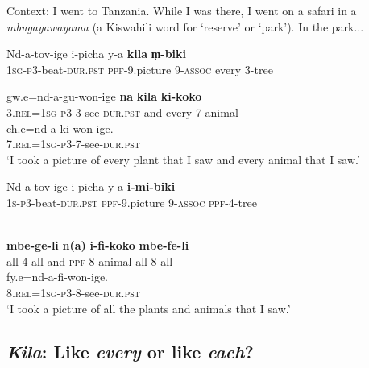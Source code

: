 \documentclass[output=paper,modfonts,nonflat]{langsci/langscibook}
\begin{document}
\begin{exe}

\ex Context: I went to Tanzania. While I was there, I went on a safari in a \textit{mbugayawayama} (a Kiswahili word for `reserve' or `park'). In the park... \label{ex:kaspercushman:photos}

\begin{xlist}

\ex 
\gll Nd-a-tov-ige i-picha y-a \textbf{kila} \textbf{m̩-biki} \\
\textsc{1sg}-\textsc{p3}-beat-\textsc{dur.pst} \textsc{ppf}-9.picture 9-\textsc{assoc} every 3-tree \\ \label{ex:kaspercushman:everyphotos}


\gll gw.e=nd-a-gu-won-ige \textbf{na} \textbf{kila} \textbf{ki-koko} \\
3.\textsc{rel}=\textsc{1sg}-\textsc{p3}-3-see-\textsc{dur.pst} and every 7-animal \\


\gll ch.e=nd-a-ki-won-ige. \\
  7.\textsc{rel}=\textsc{1sg}-\textsc{p3}-7-see-\textsc{dur.pst}  \\
  
\glt `I took a picture of every plant that I saw and every animal that I saw.' 



\ex 
\gll Nd-a-tov-ige i-picha y-a \textbf{i-mi-biki}  \\ 
\textsc{1s}-\textsc{p3}-beat-\textsc{dur.pst} \textsc{ppf}-9.picture 9-\textsc{assoc} \textsc{ppf}-4-tree \\ \


\gll \textbf{mbe-ge-li} \textbf{n(a)} \textbf{i-fi-koko} \textbf{mbe-fe-li} \label{ex:kaspercushman:allphotos} \\
 all-4-all and \textsc{ppf}-8-animal all-8-all  \\
 
 
\gll fy.e=nd-a-fi-won-ige. \\
 8.\textsc{rel}=\textsc{1sg}-\textsc{p3}-8-see-\textsc{dur.pst} \\
 
\glt `I took a picture of all the plants and animals that I saw.'

\end{xlist}
\end{exe}


\subsection{\emph{Kila}: Like \emph{every} or like \emph{each}?}  
\end{document}
